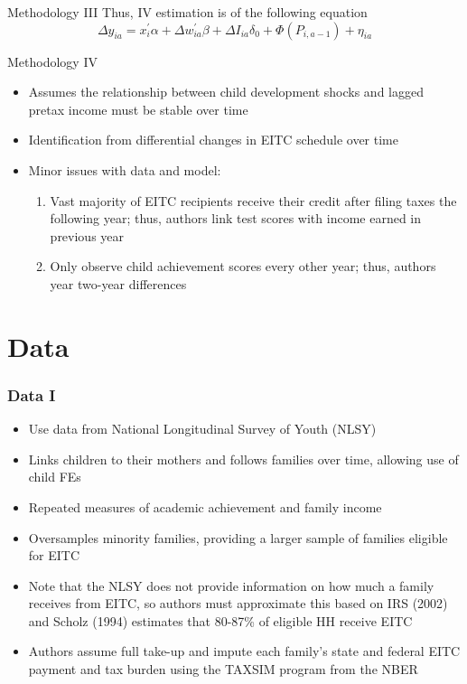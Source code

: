 \documentclass{beamer}
\begin{document}
\begin{frame}{Methodology III}
	Thus, IV estimation is of the following equation
	\begin{equation}
		\Delta y_{ia} = x_i^' \alpha + \Delta w_{ia}^' \beta + \Delta I_{ia} \delta_0 + \Phi(P_{i, a-1}) + \eta_{ia}
	\end{equation}
\end{frame}

\begin{frame}{Methodology IV}
	\begin{itemize}
		\item Assumes the relationship between child development shocks and lagged pretax income must be stable over time
		\item Identification from differential changes in EITC schedule over time
		\item Minor issues with data and model:
		\begin{enumerate}[(1)]
			\item Vast majority of EITC recipients receive their credit after filing taxes the following year; thus, authors link test scores with income earned in previous year
			\item Only observe child achievement scores every other year; thus, authors year two-year differences
		\end{enumerate}
	\end{itemize}
\end{frame}

\section{Data}


\begin{frame}
\frametitle{Data I}
\begin{itemize}
	\item Use data from National Longitudinal Survey of Youth (NLSY)
	\item Links children to their mothers and follows families over time, allowing use of child FEs
	\item Repeated measures of academic achievement and family income
	\item Oversamples minority families, providing a larger sample of families eligible for EITC
	\item Note that the NLSY does not provide information on how much a family receives from EITC, so authors must approximate this based on IRS (2002) and Scholz (1994) estimates that 80-87\% of eligible HH receive EITC
	\item Authors assume full take-up and impute each family's state and federal EITC payment and tax burden using the TAXSIM program from the NBER
\end{itemize}
\end{frame}
\end{document}
